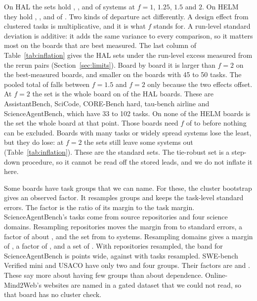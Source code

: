 \documentclass[11pt]{article}
\begin{document}
On HAL the sets hold \NumInflHalSetOne{}, \NumInflHalSetOneTwoFive{}, \NumInflHalSetOneFive{} and \NumInflHalSetTwo{} of \NumInflHalSystems{} systems at $f=1$, $1.25$, $1.5$ and $2$. On HELM they hold \NumInflHelmSetOne{}, \NumInflHelmSetOneTwoFive{}, \NumInflHelmSetOneFive{} and \NumInflHelmSetTwo{} of \NumInflHelmSystems{}. Two kinds of departure act differently. A design effect from clustered tasks is multiplicative, and it is what $f$ stands for. A run-level standard deviation is additive: it adds the same variance to every comparison, so it matters most on the boards that are best measured. The last column of Table~\ref{tab:inflation} gives the HAL sets under the run-level excess measured from the rerun pairs (Section~\ref{sec:limits}). Board by board it is larger than $f=2$ on the best-measured boards, and smaller on the boards with 45 to 50 tasks. The pooled total of \NumRerunSetAfter{} falls between $f=1.5$ and $f=2$ only because the two effects offset. At $f=2$ the set is the whole board on \NumInflHalWholeBoardsAtTwo{} of the \NumInflHalBoards{} HAL boards. These are AssistantBench, SciCode, CORE-Bench hard, tau-bench airline and ScienceAgentBench, which have 33 to 102 tasks. On none of the HELM boards is the set the whole board at that point. Those boards need $f$ of \NumInflHelmWholeFMin{} to \NumInflHelmWholeFMax{} before nothing can be excluded. Boards with many tasks or widely spread systems lose the least, but they do lose: at $f=2$ the sets still leave some systems out (Table~\ref{tab:inflation}). These are the standard sets. The tie-robust set is a step-down procedure, so it cannot be read off the stored leads, and we do not inflate it here.

Some boards have task groups that we can name. For these, the cluster bootstrap gives an observed factor. It resamples groups and keeps the task-level standard errors. The factor is the ratio of its margin to the task margin. ScienceAgentBench's \NumScienceagentbenchTasks{} tasks come from \NumClusterSabGroups{} source repositories and four science domains. Resampling repositories moves the margin from \NumClusterSabMarginTasks{} to \NumClusterSabMarginClusters{} standard errors, a factor of about \NumSabFactorRepo{}, and the set from \NumClusterSabSetTasks{} to \NumClusterSabSetClusters{} systems. Resampling domains gives a margin of \NumClusterSabDomainMarginClusters{}, a factor of \NumSabFactorDomain{}, and a set of \NumClusterSabDomainSetClusters{}. With repositories resampled, the band for ScienceAgentBench is \NumClusterSabBandWidthClusters{} points wide, against \NumClusterSabBandWidthTasks{} with tasks resampled. SWE-bench Verified mini and USACO have only two and four groups. Their factors are \NumSwebenchFactor{} and \NumUsacoFactor{}. These say more about having few groups than about dependence. Online-Mind2Web's websites are named in a gated dataset that we could not read, so that board has no cluster check.
\end{document}
